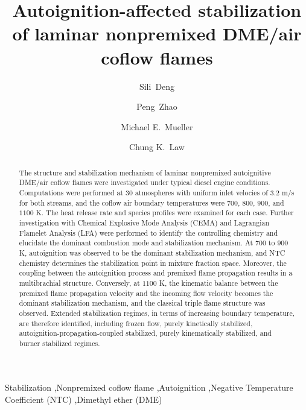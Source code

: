 \documentclass[review,3p,times]{elsarticle}
\begin{document}
\begin{frontmatter}

\title{Autoignition-affected stabilization of laminar nonpremixed DME/air coflow flames}

\author{Sili~Deng}
\author{Peng~Zhao}
\author{Michael E.~Mueller}
\author{Chung K.~Law}

\address{Department of Mechanical and Aerospace Engineering, Princeton University, Princeton, NJ 08544, USA}

\begin{abstract}

The structure and stabilization mechanism of laminar nonpremixed autoignitive DME/air coflow flames were investigated under typical diesel engine conditions.  Computations were performed at $30$ atmospheres with uniform inlet velocies of $3.2$ m/s for both streams, and the coflow air boundary temperatures were $700$, $800$, $900$, and $1100$ K.  The heat release rate and species profiles were examined for each case. Further investigation with Chemical Explosive Mode Analysis (CEMA) and Lagrangian Flamelet Analysis (LFA) were performed to identify the controlling chemistry and elucidate the dominant combustion mode and stabilization mechanism.  At $700$ to $900$ K, autoignition was observed to be the dominant stabilization mechanism, and NTC chemistry determines the stabilization point in mixture fraction space.  Moreover, the coupling between the autoignition process and premixed flame propagation results in a multibrachial structure.  Conversely, at $1100$ K, the kinematic balance between the premixed flame propagation velocity and the incoming flow velocity becomes the dominant stabilization mechanism, and the classical triple flame structure was observed.  Extended stabilization regimes, in terms of increasing boundary temperature, are therefore identified, including frozen flow, purely kinetically stabilized, autoignition-propagation-coupled stabilized, purely kinematically stabilized, and burner stabilized regimes.           

\end{abstract}

\begin{keyword} 
Stabilization \sep Nonpremixed coflow flame \sep Autoignition \sep Negative Temperature Coefficient (NTC) \sep Dimethyl ether (DME) 
\end{keyword}

\end{frontmatter}
\end{document}
